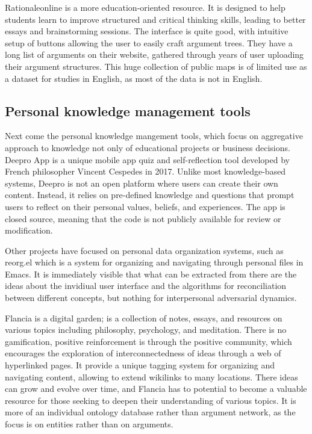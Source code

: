 \documentclass{report}
\begin{document}
{Rationaleonline \cite{noauthor_rationale_nodate} is a more education-oriented resource. It is designed to help students learn to improve structured and critical thinking skills, leading to better essays and brainstorming sessions.
The interface is quite good, with intuitive setup of buttons allowing the user to easily craft argument trees.
They have a long list of arguments on their website, gathered through years of user uploading their argument structures.
This huge collection of public maps is of limited use as a dataset for studies in English, as most of the data is not in English.

\subsection{Personal knowledge management tools}
Next come the personal knowledge mangement tools, which focus on aggregative approach to knowledge not only of educational projects or business decisions.
Deepro App \cite{noauthor_deepro_nodate} is a unique mobile app quiz and self-reflection tool developed by French philosopher Vincent Cespedes \cite{noauthor_vincent_2023} in 2017. Unlike most knowledge-based systems, Deepro is not an open platform where users can create their own content. Instead, it relies on pre-defined knowledge and questions that prompt users to reflect on their personal values, beliefs, and experiences. The app is closed source, meaning that the code is not publicly available for review or modification.

Other projects have focused on personal data organization systems, such as reorg.el \cite{noauthor_reorg_2023} which is a system for organizing and navigating through personal files in Emacs. It is immediately visible that what can be extracted from there are the ideas about the invidiual user interface and the algorithms for reconciliation between different concepts, but nothing for interpersonal adversarial dynamics.

Flancia \cite{flancian_welcome_2019} is a digital garden; is a collection of notes, essays, and resources on various topics including philosophy, psychology, and meditation. There is no gamification, positive reinforcement is through the positive community, which encourages the exploration of interconnectedness of ideas through a web of hyperlinked pages. It provide a unique tagging system for organizing and navigating content, allowing to extend wikilinks to many locations. There ideas can grow and evolve over time, and Flancia has to potential to become a valuable resource for those seeking to deepen their understanding of various topics. It is more of an individual ontology database rather than argument network, as the focus is on entities rather than on arguments.

}
\end{document}
